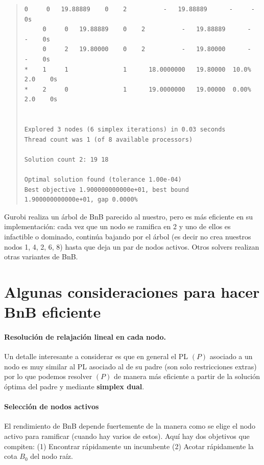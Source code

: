 \begin{quote}
\begin{lstlisting}[backgroundcolor=\color{light_gray}]
     0     0   19.88889    0    2          -   19.88889      -     -    0s
     0     0   19.88889    0    2          -   19.88889      -     -    0s
     0     2   19.80000    0    2          -   19.80000      -     -    0s
*    1     1               1      18.0000000   19.80000  10.0%   2.0    0s
*    2     0               1      19.0000000   19.00000  0.00%   2.0    0s


Explored 3 nodes (6 simplex iterations) in 0.03 seconds
Thread count was 1 (of 8 available processors)

Solution count 2: 19 18

Optimal solution found (tolerance 1.00e-04)
Best objective 1.900000000000e+01, best bound 1.900000000000e+01, gap 0.0000%
		\end{lstlisting}
    	\end{quote}
    
   Gurobi realiza un árbol de BnB parecido al nuestro, pero es más eficiente en su implementación: cada vez que un nodo se ramifica en 2 y uno de ellos es infactible o dominado, continúa bajando por el árbol (es decir no crea nuestros nodos 1, 4, 2, 6, 8) hasta que deja un par de nodos activos. Otros solvers realizan otras variantes de BnB.
   
    
    
    \section{Algunas consideraciones para hacer BnB eficiente}
    
    \paragraph{Resolución de relajación lineal en cada nodo.}
    Un detalle interesante a considerar es que en general el PL $(P)$ asociado a un nodo es muy similar al PL asociado al de su padre (son solo restricciones extras) por lo que podemos resolver $(P)$ de manera más eficiente a partir de la solución óptima del padre y mediante \textbf{simplex dual}.
    
    \paragraph{Selección de nodos activos}
    El rendimiento de BnB depende fuertemente de la manera como se elige el nodo activo para ramificar (cuando hay varios de estos). Aquí hay dos objetivos que compiten: (1) Encontrar rápidamente un incumbente (2) Acotar rápidamente la cota $B_0$ del nodo raíz.
    
